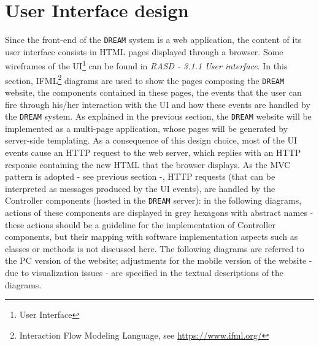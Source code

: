 \documentclass{article}
\begin{document}
\section{User Interface design}
Since the front-end of the \verb|DREAM| system is a web application, the content of its user interface consists in HTML pages displayed through a browser. Some wireframes of the UI\footnote{User Interface} can be found in \textit{RASD - 3.1.1 User interface}. In this section, IFML\footnote{Interaction Flow Modeling Language, see \url{https://www.ifml.org/}} diagrams are used to show the pages composing the \verb|DREAM| website, the components contained in these pages, the events that the user can fire through his/her interaction with the UI and how these events are handled by the \verb|DREAM| system.
As explained in the previous section, the \verb|DREAM| website will be implemented as a multi-page application, whose pages will be generated by server-side templating. As a consequence of this design choice, most of the UI events cause an HTTP request to the web server, which replies with an HTTP response containing the new HTML that the browser displays. As the MVC pattern is adopted - see previous section -, HTTP requests (that can be interpreted as messages produced by the UI events), are handled by the Controller components (hosted in the \verb|DREAM| server): in the following diagrams, actions of these components are displayed in grey hexagons with abstract names - these actions should be a guideline for the implementation of Controller components, but their mapping with software implementation aspects such as classes or methods is not discussed here.
The following diagrams are referred to the PC version of the website; adjustments for the mobile version of the website - due to visualization issues - are specified in the textual descriptions of the diagrams.
\vspace{9cm}
\end{document}

